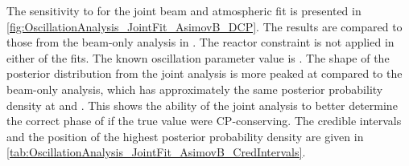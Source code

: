 The sensitivity to  for the joint beam and atmospheric fit is presented in \autoref{fig:OscillationAnalysis_JointFit_AsimovB_DCP}. The results are compared to those from the beam-only analysis in \cite{Dunne2020-uf, t2k_tn_393}. The reactor constraint is not applied in either of the fits. The known oscillation parameter value is . The shape of the posterior distribution from the joint analysis is more peaked at  compared to the beam-only analysis, which has approximately the same posterior probability density at  and . This shows the ability of the joint analysis to better determine the correct phase of  if the true value were CP-conserving. The \quickmath{1\sigma} credible intervals and the position of the highest posterior probability density are given in \autoref{tab:OscillationAnalysis_JointFit_AsimovB_CredIntervals}. 

